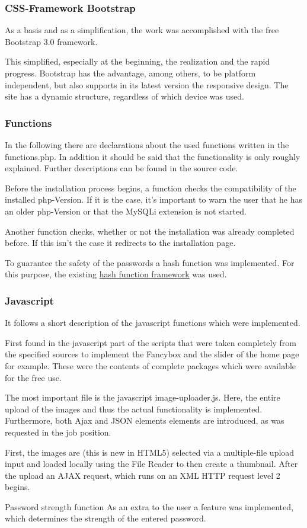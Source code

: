 \documentclass[a4paper,12pt,oneside]{article} %
\begin{document}
\subsubsection{CSS-Framework Bootstrap}

As a basis and as a simplification, the work was accomplished with the free Bootstrap 3.0 framework. 

This simplified, especially at the beginning, the realization and the rapid progress. 
Bootstrap has the advantage, among others, to be platform independent, but also supports in its 
latest version the \textquotedbl{}responsive design\textquotedbl{}. The site has a dynamic structure, 
regardless of which device was used.

\subsubsection{Functions}
In the following there are declarations about the used functions written in the functions.php.
In addition it should be said that the functionality is only roughly explained. Further descriptions can be found in the source code.

Before the installation process begins, a function checks the compatibility of the installed php-Version. If it is the case, it's important to warn the user that he has an older php-Version or that the MySQLi extension is not started. 

Another function checks, whether or not the installation was already completed before. If this isn't the case it redirects to the installation page. 

To guarantee the safety of the passwords a hash function was implemented. 
For this purpose, the existing \hyperlink{http://www.openwall.com/phpass/}{hash function framework}  was used. 

\subsubsection{Javascript}
It follows a short description of the javascript functions which were implemented. 

First found in the javascript part of the scripts that were taken completely from the specified sources to implement the Fancybox and the slider of the home page for example. These were the contents of complete packages which were available for the free use.

The most important file is the javascript image-uploader.js.
Here, the entire upload of the images and thus the actual functionality is implemented. Furthermore, both Ajax and JSON elements elements are introduced, as was requested in the job position.

First, the images are (this is new in HTML5) selected via a multiple-file upload input and loaded locally using the File Reader to then create a thumbnail. After the upload an AJAX request, which runs on an XML HTTP request level 2 begins.

Password strength function
As an extra to the user a feature was implemented, which determines the strength of the entered password.
\end{document}
